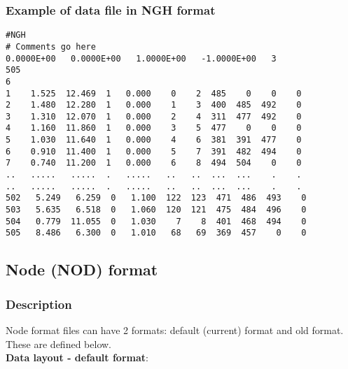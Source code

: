\documentclass{article}
\begin{document}
\subsubsection[Example of data file in NGH format]{Example of data file in NGH format}
\begin{small}
\begin{lstlisting}
#NGH
# Comments go here
0.0000E+00   0.0000E+00   1.0000E+00   -1.0000E+00   3
505
6
1    1.525  12.469  1   0.000    0    2  485    0    0    0
2    1.480  12.280  1   0.000    1    3  400  485  492    0
3    1.310  12.070  1   0.000    2    4  311  477  492    0
4    1.160  11.860  1   0.000    3    5  477    0    0    0
5    1.030  11.640  1   0.000    4    6  381  391  477    0
6    0.910  11.400  1   0.000    5    7  391  482  494    0
7    0.740  11.200  1   0.000    6    8  494  504    0    0
..   .....   .....  .   .....   ..   ..  ...  ...    .    .
..   .....   .....  .   .....   ..   ..  ...  ...    .    .
502   5.249   6.259  0   1.100  122  123  471  486  493    0
503   5.635   6.518  0   1.060  120  121  475  484  496    0
504   0.779  11.055  0   1.030    7    8  401  468  494    0
505   8.486   6.300  0   1.010   68   69  369  457    0    0
\end{lstlisting}
\end{small}



\newpage
\subsection[Node (NOD) format]{Node (NOD) format}

\subsubsection[Description]{Description}

Node format files can have 2 formats: default (current) format and old format.
These are defined below.\\

\textbf{Data layout - default format}: \\ 
\end{document}
